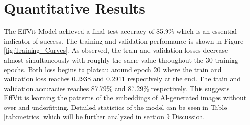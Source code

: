 \documentclass{article} %
\begin{document}


\section{Quantitative Results}
The EffVit Model achieved a final test accuracy of 85.9\% which is an essential indicator of success. The training and validation performance is shown in Figure \ref{fig:Training_Curves}. As observed, the train and validation losses decrease almost simultaneously with roughly the same value throughout the 30 training epochs. Both loss begins to plateau around epoch 20 where the train and validation loss reaches 0.2938 and 0.2911 respectively at the end. The train and validation accuracies reaches 87.79\% and 87.29\% respectively. This suggests EffVit is learning the patterns of the embeddings of AI-generated images without over and underfitting. Detailed statistics of the model can be seen in Table \ref{tab:metrics} which will be further analyzed in section 9 Discussion.
\end{document}
